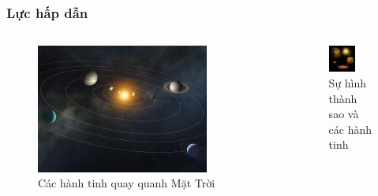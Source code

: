 \begin{frame}
    \frametitle{Lực hấp dẫn}
    \begin{columns}
    \begin{column}{0.5\textwidth}
        \begin{figure}
        \centering
        \includegraphics[width=0.8\textwidth]{Slides/Figure/solarsystem.jpg}
        \caption{Các hành tinh quay quanh Mặt Trời}
        \end{figure}
    \end{column}
    \begin{column}{0.5\textwidth}
        \begin{figure}
        \centering
        \includegraphics[width=0.6\textwidth]{Slides/Figure/planetformation.jpg}
        \caption{Sự hình thành sao và các hành tinh}
        \end{figure}
    \end{column}
    \end{columns}
\end{frame}

